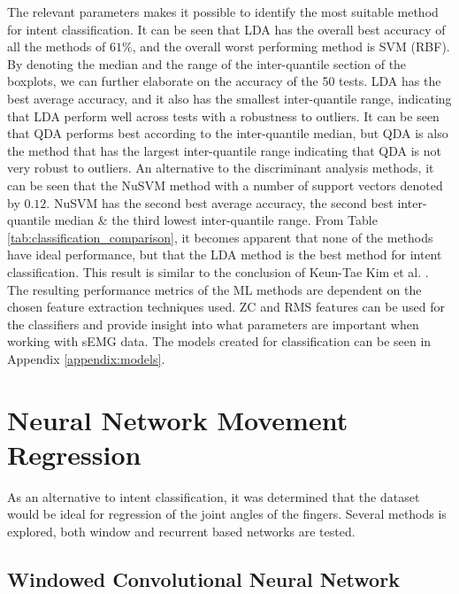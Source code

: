 \documentclass[../main.tex]{subfiles}
\begin{document}
The relevant parameters makes it possible to identify the most suitable method for intent classification.
It can be seen that LDA has the overall best accuracy of all the methods of $61\%$, and the overall worst performing method is \gls{SVM} (\gls{RBF}).
By denoting the median and the range of the inter-quantile section of the boxplots, we can further elaborate on the accuracy of the 50 tests.
\gls{LDA} has the best average accuracy, and it also has the smallest inter-quantile range, indicating that \gls{LDA} perform well across tests with a robustness to outliers. 
It can be seen that \gls{QDA} performs best according to the inter-quantile median, but \gls{QDA} is also the method that has the largest inter-quantile range indicating that \gls{QDA} is not very robust to outliers.
An alternative to the discriminant analysis methods, it can be seen that the Nu\gls{SVM} method with a number of support vectors denoted by $0.12$.
Nu\gls{SVM} has the second best average accuracy, the second best inter-quantile median \& the third lowest inter-quantile range.
From Table \ref{tab:classification_comparison}, it becomes apparent that none of the methods have ideal performance, but that the \gls{LDA} method is the best method for intent classification.
This result is similar to the conclusion of Keun-Tae Kim et al. \cite{KeunTaeKim2021}.
The resulting performance metrics of the \gls{ML} methods are dependent on the chosen feature extraction techniques used.
\gls{ZC} and \gls{RMS} features can be used for the classifiers and provide insight into what parameters are important when working with \gls{sEMG} data.
The models created for classification can be seen in Appendix \ref{appendix:models}.

\newpage
\section{Neural Network Movement Regression}
\label{sec:regression}

As an alternative to intent classification, it was determined that the dataset would be ideal for regression of the joint angles of the fingers.
Several methods is explored, both window and recurrent based networks are tested.


\subsection{Windowed Convolutional Neural Network}
\end{document}
